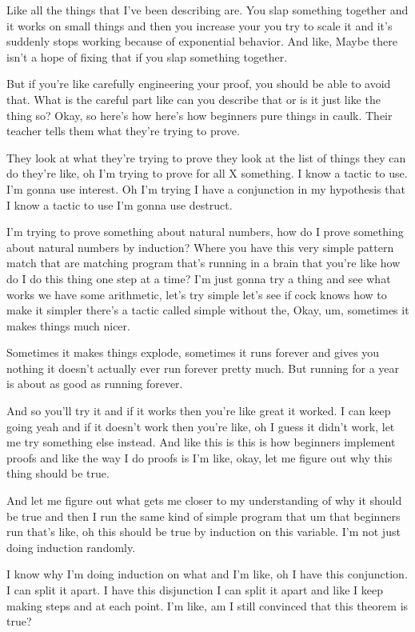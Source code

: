 Like all the things that I've been describing are. You slap something together and it works on small things and then you increase your you try to scale it and it's suddenly stops working because of exponential behavior. And like, Maybe there isn't a hope of fixing that if you slap something together. 

But if you're like carefully engineering your proof, you should be able to avoid that. What is the careful part like can you describe that or is it just like the thing so? Okay, so here's how here's how beginners pure things in caulk. Their teacher tells them what they're trying to prove. 

They look at what they're trying to prove they look at the list of things they can do they're like, oh I'm trying to prove for all X something. I know a tactic to use. I'm gonna use interest. Oh I'm trying I have a conjunction in my hypothesis that I know a tactic to use I'm gonna use destruct. 

I'm trying to prove something about natural numbers, how do I prove something about natural numbers by induction? Where you have this very simple pattern match that are matching program that's running in a brain that you're like how do I do this thing one step at a time? I'm just gonna try a thing and see what works we have some arithmetic, let's try simple let's see if cock knows how to make it simpler there's a tactic called simple without the, Okay, um, sometimes it makes things much nicer. 

Sometimes it makes things explode, sometimes it runs forever and gives you nothing it doesn't actually ever run forever pretty much. But running for a year is about as good as running forever. 

And so you'll try it and if it works then you're like great it worked. I can keep going yeah and if it doesn't work then you're like, oh I guess it didn't work, let me try something else instead. And like this is this is how beginners implement proofs and like the way I do proofs is I'm like, okay, let me figure out why this thing should be true. 

And let me figure out what gets me closer to my understanding of why it should be true and then I run the same kind of simple program that um that beginners run that's like, oh this should be true by induction on this variable. I'm not just doing induction randomly. 

I know why I'm doing induction on what and I'm like, oh I have this conjunction. I can split it apart. I have this disjunction I can split it apart and like I keep making steps and at each point. I'm like, am I still convinced that this theorem is true? 

